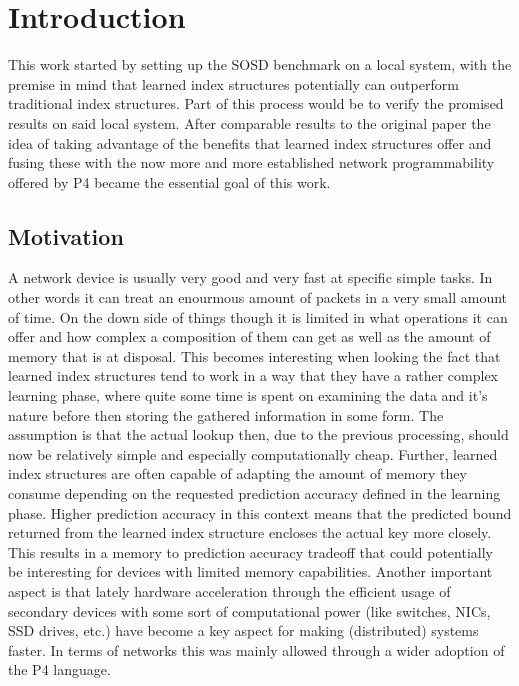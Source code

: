 
\chapter{Introduction}
\label{ch:introduction}
This work started by setting up the SOSD benchmark \cite{sosd-neurips} on a local system, with the premise in mind that learned index structures potentially can outperform traditional index structures. Part of this process would be to verify the promised results on said local system. After comparable results to the original paper the idea of taking advantage of the benefits that learned index structures offer and fusing these with the now more and more established network programmability offered by P4 became the essential goal of this work.

\section{Motivation}
A network device is usually very good and very fast at specific simple tasks. In other words it can treat an enourmous amount of packets in a very small amount of time. On the down side of things though it is limited in what operations it can offer and how complex a composition of them can get as well as the amount of memory that is at disposal. This becomes interesting when looking the fact that learned index structures tend to work in a way that they have a rather complex learning phase, where quite some time is spent on examining the data and it's nature before then storing the gathered information in some form. The assumption is that the actual lookup then, due to the previous processing, should now be relatively simple and especially computationally cheap. Further, learned index structures are often capable of adapting the amount of memory they consume depending on the requested prediction accuracy defined in the learning phase. Higher prediction accuracy in this context means that the predicted bound returned from the learned index structure encloses the actual key more closely. This results in a memory to prediction accuracy tradeoff that could potentially be interesting for devices with limited memory capabilities. Another important aspect is that lately hardware acceleration through the efficient usage of secondary devices with some sort of computational power (like switches, NICs, SSD drives, etc.) have become a key aspect for making (distributed) systems faster. In terms of networks this was mainly allowed through a wider adoption of the P4 language.\\

